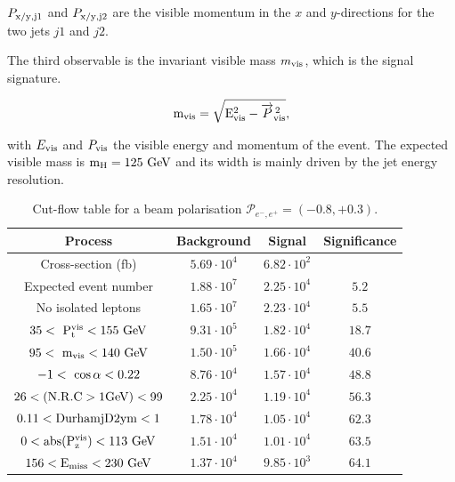   $ P_{\rm{x/y,j1}}$ and $ P_{\rm{x/y,j2}}$ are the visible momentum in the $x$ and $y$-directions for the two jets $j1$ and $j2$.

  The third observable is the invariant visible mass $m_{\rm{vis}}$, which is the signal signature.

  \begin{equation}
   \rm{m_{vis}} = \sqrt{E^2_{\rm{vis}} - \overrightarrow{P}^{\,2}_{\rm{vis}}},
  \end{equation}

  with $E_{\rm{vis}}$ and $P_{\rm{vis}}$ the visible energy and momentum of the event.
  The expected visible mass is $\rm{m_H} = 125~\rm{GeV}$ and its width is mainly driven by the jet energy resolution.

  \begin{table}[!tbh]
    \begin{tabular}{c c c c}
      \hline
      Process                                     & Background          & Signal              & Significance  \tabularnewline
      \hline
      \hline
      Cross-section (fb)                          & $5.69 \cdot 10^{4}$ & $6.82 \cdot 10^{2}$ &               \tabularnewline
      \hline
      Expected event number                       & $1.88 \cdot 10^{7}$ & $2.25 \cdot 10^{4}$ & $5.2$         \tabularnewline
      No isolated leptons                         & $1.65 \cdot 10^{7}$ & $2.23 \cdot 10^{4}$ & $5.5$         \tabularnewline
      {$35 <~\rm{{P}_{t}^{vis}} < 155~\rm{GeV} $} & $9.31 \cdot 10^{5}$ & $1.82 \cdot 10^{4}$ & $18.7$        \tabularnewline
      {$95 <~\rm{m_{vis}}< 140~\rm{GeV}$}         & $1.50 \cdot 10^{5}$ & $1.66 \cdot 10^{4}$ & $40.6$        \tabularnewline
      {$-1 <~\rm{\cos{\alpha}}< 0.22$}            & $8.76 \cdot 10^{4}$ & $1.57 \cdot 10^{4}$ & $48.8$        \tabularnewline
      $26 < (\rm{N.R.C > 1GeV}) < 99$             & $2.25 \cdot 10^{4}$ & $1.19 \cdot 10^{4}$ & $56.3$        \tabularnewline
      $0.11 < \rm{DurhamjD2ym} < 1$               & $1.78 \cdot 10^{4}$ & $1.05 \cdot 10^{4}$ & $62.3$        \tabularnewline
      $0 < \rm{abs(P_{z}^{vis})} < 113~\rm{GeV}$& $1.51 \cdot 10^{4}$ & $1.01 \cdot 10^{4}$ & $63.5$        \tabularnewline
      $156 < \rm{E_{miss}} < 230~\rm{GeV}$   & $1.37 \cdot 10^{4}$ & $9.85 \cdot 10^{3}$ & $64.1$        \tabularnewline      
      \hline %
    \end{tabular}
    \caption{Cut-flow table for a beam polarisation $\mathcal{P}_{e^{-},e^{+}} = (-0.8, +0.3)$.}
    \label{tab:cutFlow}
  \end{table}

